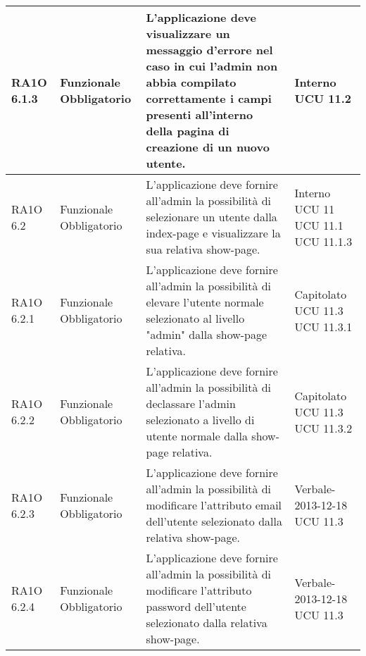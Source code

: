 \begin{center}
\begin{longtable}{ | l | p{2cm} | p{5cm} | p{1.7cm} |}
				RA1O 6.1.3 & Funzionale \newline  Obbligatorio  & L'applicazione deve visualizzare un messaggio d'errore nel caso in cui l'admin non abbia compilato correttamente i campi presenti all'interno della pagina di creazione di un nuovo utente. &  Interno \newline  UCU 11.2 \newline  \\ \hline      
				RA1O 6.2 & Funzionale \newline  Obbligatorio  & L'applicazione deve fornire all'admin la possibilità di selezionare un utente dalla index-page e visualizzare la sua relativa show-page. &  Interno \newline  UCU 11 \newline  UCU 11.1 \newline  UCU 11.1.3 \newline  \\ \hline      
				RA1O 6.2.1 & Funzionale \newline  Obbligatorio  & L'applicazione deve fornire all'admin la possibilità di elevare l'utente normale selezionato al livello "admin" dalla show-page relativa. &  Capitolato \newline  UCU 11.3 \newline  UCU 11.3.1 \newline  \\ \hline      
				RA1O 6.2.2 & Funzionale \newline  Obbligatorio  & L'applicazione deve fornire all'admin la possibilità di declassare l'admin selezionato a livello di utente normale dalla show-page relativa. &  Capitolato \newline  UCU 11.3 \newline  UCU 11.3.2 \newline  \\ \hline      
				RA1O 6.2.3 & Funzionale \newline  Obbligatorio  & L'applicazione deve fornire all'admin la possibilità di modificare l'attributo email dell'utente selezionato dalla relativa show-page. &  Verbale-2013-12-18 \newline  UCU 11.3 \newline  \\ \hline      
				RA1O 6.2.4 & Funzionale \newline  Obbligatorio  & L'applicazione deve fornire all'admin la possibilità di modificare l'attributo password dell'utente selezionato dalla relativa show-page.
 &  Verbale-2013-12-18 \newline  UCU 11.3 \newline  \\ \hline      

\end{longtable}
\end{center}
